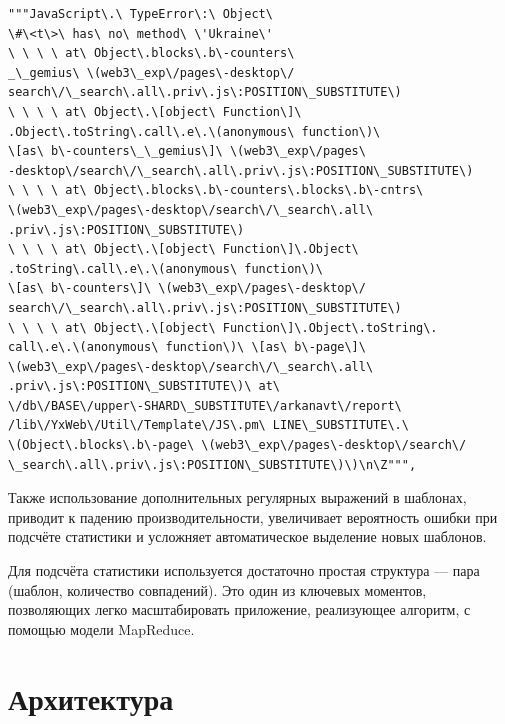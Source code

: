 \begin{center}
  \begin{verbatim}
"""JavaScript\.\ TypeError\:\ Object\
\#\<t\>\ has\ no\ method\ \'Ukraine\'
\ \ \ \ at\ Object\.blocks\.b\-counters\
_\_gemius\ \(web3\_exp\/pages\-desktop\/
search\/\_search\.all\.priv\.js\:POSITION\_SUBSTITUTE\)
\ \ \ \ at\ Object\.\[object\ Function\]\
.Object\.toString\.call\.e\.\(anonymous\ function\)\
\[as\ b\-counters\_\_gemius\]\ \(web3\_exp\/pages\
-desktop\/search\/\_search\.all\.priv\.js\:POSITION\_SUBSTITUTE\)
\ \ \ \ at\ Object\.blocks\.b\-counters\.blocks\.b\-cntrs\
\(web3\_exp\/pages\-desktop\/search\/\_search\.all\
.priv\.js\:POSITION\_SUBSTITUTE\)
\ \ \ \ at\ Object\.\[object\ Function\]\.Object\
.toString\.call\.e\.\(anonymous\ function\)\
\[as\ b\-counters\]\ \(web3\_exp\/pages\-desktop\/
search\/\_search\.all\.priv\.js\:POSITION\_SUBSTITUTE\)
\ \ \ \ at\ Object\.\[object\ Function\]\.Object\.toString\.
call\.e\.\(anonymous\ function\)\ \[as\ b\-page\]\
\(web3\_exp\/pages\-desktop\/search\/\_search\.all\
.priv\.js\:POSITION\_SUBSTITUTE\)\ at\
\/db\/BASE\/upper\-SHARD\_SUBSTITUTE\/arkanavt\/report\
/lib\/YxWeb\/Util\/Template\/JS\.pm\ LINE\_SUBSTITUTE\.\
\(Object\.blocks\.b\-page\ \(web3\_exp\/pages\-desktop\/search\/
\_search\.all\.priv\.js\:POSITION\_SUBSTITUTE\)\)\n\Z""",
  \end{verbatim}
\end{center}

Также использование дополнительных регулярных выражений в шаблонах, приводит
к падению производительности, увеличивает вероятность ошибки при подсчёте
статистики и усложняет автоматическое выделение новых шаблонов.

Для подсчёта статистики используется достаточно простая структура --- пара
(шаблон, количество совпадений). Это один из ключевых моментов, позволяющих
легко масштабировать приложение, реализующее алгоритм,
с помощью модели MapReduce.

\section{Архитектура}

